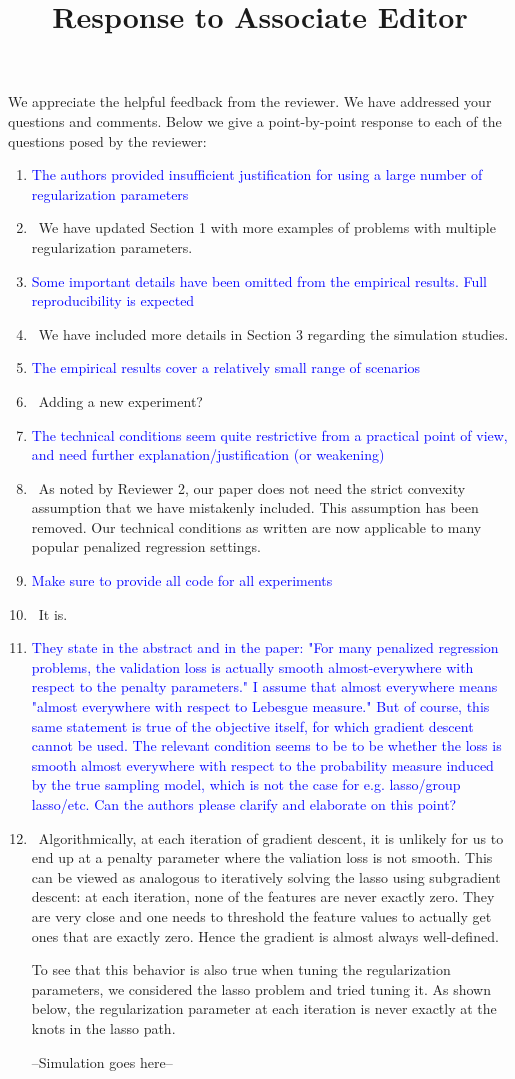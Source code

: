 \documentclass[]{article}
\title{Response to Associate Editor}
\newcommand{\point}[1]{\item \textcolor{blue}{#1}}
\newcommand{\reply}{\item[]\ }
\begin{document}
	\maketitle
		
	We appreciate the helpful feedback from the reviewer. We have addressed your questions and comments. Below we give a point-by-point response to each of the questions posed by the reviewer:
		
	\begin{enumerate}
		\point{The authors provided insufficient justification for using a large number of regularization parameters}
		\reply We have updated Section 1 with more examples of problems with multiple regularization parameters.
		\point{Some important details have been omitted from the empirical results. Full reproducibility is expected}
		\reply We have included more details in Section 3 regarding the simulation studies.
		\point{The empirical results cover a relatively small range of scenarios}
		\reply Adding a new experiment?
		\point{The technical conditions seem quite restrictive from a practical point of view, and need further explanation/justification (or weakening)}
		\reply As noted by Reviewer 2, our paper does not need the strict convexity assumption that we have mistakenly included. This assumption has been removed. Our technical conditions as written are now applicable to many popular penalized regression settings.
		\point{Make sure to provide all code for all experiments}
		\reply It is.
		\point{They state in the abstract and in the paper: "For many penalized regression problems, the validation loss is actually smooth almost-everywhere with respect to the penalty parameters."  I assume that almost everywhere means "almost everywhere with respect to Lebesgue measure."  But of course, this same statement is true of the objective itself, for which gradient descent cannot be used.  The relevant condition seems to be to be whether the loss is smooth almost everywhere with respect to the probability measure induced by the true sampling model, which is not the case for e.g. lasso/group lasso/etc.  Can the authors please clarify and elaborate on this point?}
		\reply Algorithmically, at each iteration of gradient descent, it is unlikely for us to end up at a penalty parameter where the valiation loss is not smooth. This can be viewed as analogous to iteratively solving the lasso using subgradient descent: at each iteration, none of the features are never exactly zero. They are very close and one needs to threshold the feature values to actually get ones that are exactly zero. Hence the gradient is almost always well-defined.
		
		To see that this behavior is also true when tuning the regularization parameters, we considered the lasso problem and tried tuning it. As shown below, the regularization parameter at each iteration is never exactly at the knots in the lasso path.
		
		--Simulation goes here--
	\end{enumerate}
\end{document}
